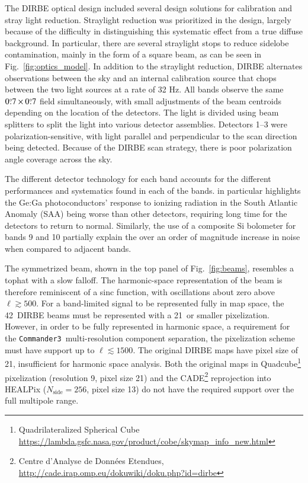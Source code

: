 \documentclass{aa}
\def\commanderthree{\texttt{Commander3}}
\def\COBE{\textit{COBE}}
\begin{document}
The DIRBE optical design included several design solutions for calibration and stray light reduction. Straylight reduction was prioritized in the design, largely because of the difficulty in distinguishing this systematic effect from a true diffuse background. In particular, there are several straylight stops to reduce sidelobe contamination, mainly in the form of a square beam, as can be seen in Fig.~\ref{fig:optics_model}. In addition to the straylight reduction, DIRBE alternates observations between the sky and an internal calibration source that chops between the two light sources at a rate of 32 Hz.
All bands observe the same $0\overset{\circ}{.}7\times0\overset{\circ}{.}7$  field simultaneously, with small adjustments of the beam centroids depending on the location of the detectors. The light is divided using beam splitters to split the light into various detector assemblies. Detectors 1--3 were polarization-sensitive, with light parallel and perpendicular to the scan direction being detected. Because of the DIRBE scan strategy, there is poor polarization angle coverage across the sky.



The different detector technology for each band accounts for the different performances and systematics found in each of the bands. \citet{silverberg93} in particular highlights the Ge:Ga photoconductors' response to ionizing radiation in the South Atlantic Anomaly (SAA) being worse than other detectors, requiring long time for the detectors to return to normal. Similarly, the use of a composite Si bolometer for bands 9 and 10 partially explain the over an order of magnitude increase in noise when compared to adjacent bands.

The symmetrized beam, shown in the top panel of Fig.~\ref{fig:beams}, resembles a tophat with a slow falloff. The harmonic-space representation of the beam is therefore reminiscent of a sinc function, with oscillations about zero above $\ell\gtrsim500$. For a band-limited signal to be represented fully in map space, the 42\arcm\ DIRBE beams must be represented with a 21\arcm\ or smaller pixelization. However, in order to be fully represented in harmonic space, a requirement for the \commanderthree\ multi-resolution component separation, the pixelization scheme must have support up to $\ell\lesssim1500$. The original DIRBE maps have pixel size of 21\arcm, insufficient for harmonic space analysis.
Both the original maps in Quadcube\footnote{
	Quadrilateralized Spherical Cube \url{https://lambda.gsfc.nasa.gov/product/cobe/skymap\_info\_new.html}
}
pixelization (resolution 9, pixel size 21\arcm) and the CADE\footnote{Centre d'Analyse de Données Etendues, \url{http://cade.irap.omp.eu/dokuwiki/doku.php?id=dirbe}} reprojection into HEALPix ($N_\mathrm{side}=256$, pixel size 13) do not have the required support over the full multipole range. 
\end{document}
